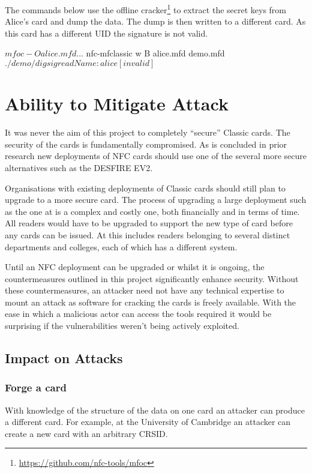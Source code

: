 \documentclass[dissertation.tex]{subfiles}
\begin{document}
  The commands below use the \mifare{} offline cracker\footnote{\url{https://github.com/nfc-tools/mfoc}} to extract the secret keys from Alice's card and dump the data. The dump is then written to a different card. As this card has a different UID the signature is not valid.
  \begin{code}[numbers=none,gobble=0]{{}}
    $ mfoc -O alice.mfd
    ...
    $ nfc-mfclassic w B alice.mfd demo.mfd
    $ ./demo/digsig read
    Name: alice [invalid]
    $
  \end{code}


  \section{Ability to Mitigate Attack}

  It was never the aim of this project to completely ``secure'' \mifare{} Classic cards. The security of the cards is fundamentally compromised. As is concluded in prior research\cite{garcia2008dismantling} new deployments of NFC cards should use one of the several more secure alternatives such as the \mifare{} DESFIRE EV2.\@

  Organisations with existing deployments of \mifare{} Classic cards should still plan to upgrade to a more secure card. The process of upgrading a large deployment such as the one at \UoC{} is a complex and costly one, both financially and in terms of time. All readers would have to be upgraded to support the new type of card before any cards can be issued. At \UoC{} this includes readers belonging to several distinct departments and colleges, each of which has a different system.

  Until an NFC deployment can be upgraded or whilst it is ongoing, the countermeasures outlined in this project significantly enhance security. Without these countermeasures, an attacker need not have any technical expertise to mount an attack as software for cracking the cards is freely available. With the ease in which a malicious actor can access the tools required it would be surprising if the vulnerabilities weren't being actively exploited.

  \subsection{Impact on Attacks}

  \subsubsection{Forge a card}
  With knowledge of the structure of the data on one card an attacker can produce a different card. For example, at the University of Cambridge an attacker can create a new card with an arbitrary CRSID.\@
\end{document}
